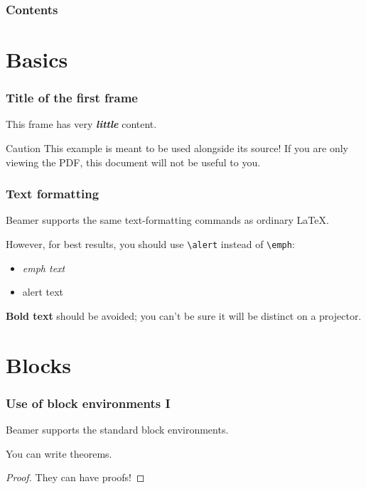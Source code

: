 \begin{frame}
  \titlepage
\end{frame}

\begin{frame}
  \frametitle{Contents}
  \toc
\end{frame}

\section{Basics}
\begin{frame}
  \frametitle{Title of the first frame}
  This frame has very \textit{\textbf{little}} content.

  \begin{alertblock}{Caution}
    This example is meant to be used alongside its source!
    If you are only viewing the PDF, this document will not be useful to you.
  \end{alertblock}
\end{frame}

\begin{frame}[fragile] %
  \frametitle{Text formatting}
  Beamer supports the same text-formatting commands as ordinary \LaTeX{}.

  However, for best results, you should use \verb|\alert| instead of \verb|\emph|:

  \begin{itemize}
  \item \emph{emph text}
  \item \alert{alert text}
  \end{itemize}

  \textbf{Bold text} should be avoided; you can't be sure it will be distinct on a projector.
\end{frame}

\section{Blocks}
\begin{frame}
  \frametitle{Use of block environments I}
  Beamer supports the standard block environments.

  \begin{theorem}
    You can write theorems.
  \end{theorem}

  \begin{proof}
    They can have proofs!
  \end{proof}
\end{frame}

